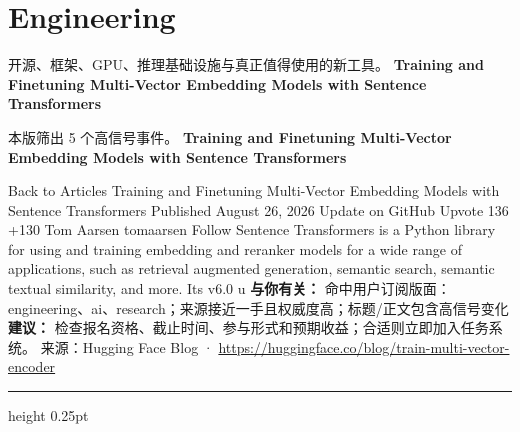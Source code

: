 \documentclass[10.5pt]{ctexart}
\begin{document}
\section*{Engineering}
{\color{ormuted} 开源、框架、GPU、推理基础设施与真正值得使用的新工具。}
\vspace{2mm}
{\LARGE\bfseries Training and Finetuning Multi-Vector Embedding Models with Sentence Transformers}\par
\vspace{1mm}
{\color{ormuted} 本版筛出 5 个高信号事件。}
\vspace{3mm}
{\Large\bfseries Training and Finetuning Multi-Vector Embedding Models with Sentence Transformers}\par
Back to Articles Training and Finetuning Multi-Vector Embedding Models with Sentence Transformers Published August 26, 2026 Update on GitHub Upvote 136 +130 Tom Aarsen tomaarsen Follow Sentence Transformers is a Python library for using and training embedding and reranker models for a wide range of applications, such as retrieval augmented generation, semantic search, semantic textual similarity, and more. Its v6.0 u
\textbf{与你有关：} 命中用户订阅版面：engineering、ai、research；来源接近一手且权威度高；标题/正文包含高信号变化
\textbf{建议：} 检查报名资格、截止时间、参与形式和预期收益；合适则立即加入任务系统。
{\footnotesize\color{ormuted} 来源：Hugging Face Blog · \url{https://huggingface.co/blog/train-multi-vector-encoder}}
\vspace{4mm}
\hrule height 0.25pt
\vspace{3mm}
\end{document}
